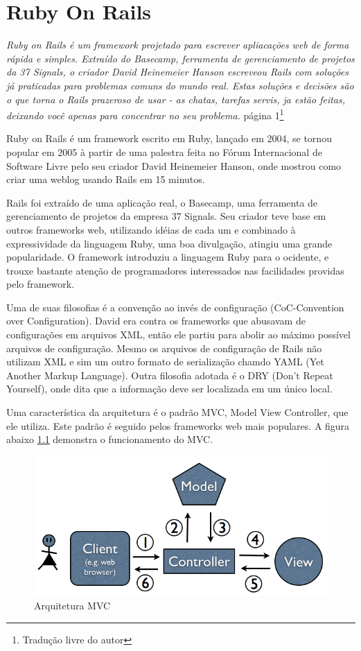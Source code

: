 \chapter{Ruby On Rails}

\emph{Ruby on Rails é um framework projetado para escrever apliacações web de forma rápida e simples. Extraído do Basecamp, ferramenta de gerenciamento de projetos da 37 Signals, o criador David Heinemeier Hanson escreveou Rails com soluções já praticadas para problemas comuns do mundo real. Estas soluções e decisões são o que torna o Rails prazeroso de usar - as chatas, tarefas servis, ja estão feitas, deixando você apenas para concentrar no seu problema.}
\cite{rails_in_nutshell}{página 1}\footnote{Tradução livre do autor}

Ruby on Rails é um framework escrito em Ruby, lançado em 2004, se tornou popular em 2005 à partir de uma palestra feita no Fórum Internacional de Software Livre pelo seu criador David Heinemeier Hanson, onde mostrou como criar uma weblog usando Rails em 15 minutos. 

Rails foi extraído de uma aplicação real, o Basecamp, uma ferramenta de gerenciamento de projetos da empresa 37 Signals. Seu criador teve base em outros frameworks web, utilizando idéias de cada um e combinado à expressividade da linguagem Ruby, uma boa divulgação, atingiu uma grande popularidade. O framework introduziu a linguagem Ruby para o ocidente, e trouxe bastante atenção de programadores interessados nas facilidades providas pelo framework.

Uma de suas filosofias é a convenção ao invés de configuração (CoC-Convention over Configuration). David era contra os frameworks que abusavam de configurações em arquivos XML, então ele partiu para abolir ao máximo possível arquivos de configuração. Mesmo os arquivos de configuração de Rails não utilizam XML e sim um outro formato de serialização chamdo YAML (Yet Another Markup Language). Outra filosofia adotada é o DRY (Don't Repeat Yourself), onde dita que a informação deve ser localizada em um único local.     

Uma característica da arquitetura é o padrão MVC, Model View Controller, que ele utiliza. Este padrão é seguido pelos frameworks web mais populares. A figura abaixo \ref{fig:mvc-diagram} demonstra o funcionamento do MVC.

\begin{figure}[here]
\includegraphics[width=150mm]{mvc-diagram.png}
\caption{Arquitetura MVC}
\label{fig:mvc-diagram}
\end{figure}

